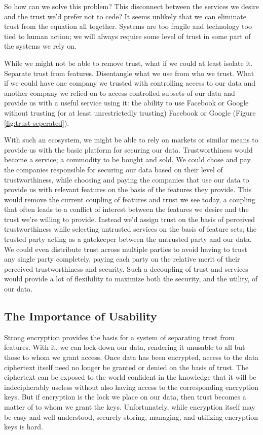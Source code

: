 So how can we solve this problem? This disconnect between the services
we desire and the trust we'd prefer not to cede? It seems unlikely
that we can eliminate trust from the equation all together. Systems
are too fragile and technology too tied to human action; we will
always require some level of trust in some part of the systems we rely
on.

While we might not be able to remove trust, what if we could at least
isolate it. Separate trust from features. Disentangle what we use from
who we trust. What if we could have one company we trusted with
controlling access to our data and another company we relied on to
access controlled subsets of our data and provide us with a useful
service using it: the ability to use Facebook or Google without
trusting (or at least unrestrictedly trusting) Facebook or Google
(Figure \ref{fig:trust-seperated}).

With such an ecosystem, we might be able to rely on markets or similar
means to provide us with the basic platform for securing our
data. Trustworthiness would become a service; a commodity to be bought
and sold. We could chose and pay the companies responsible for
securing our data based on their level of trustworthiness, while
choosing and paying the companies that use our data to provide us with
relevant features on the basis of the features they provide. This
would remove the current coupling of features and trust we see today,
a coupling that often leads to a conflict of interest between the
features we desire and the trust we're willing to provide. Instead
we'd assign trust on the basis of perceived trustworthiness while
selecting untrusted services on the basis of feature sets; the trusted
party acting as a gatekeeper between the untrusted party and our
data. We could even distribute trust across multiple parties to avoid
having to trust any single party completely, paying each party on the
relative merit of their perceived trustworthiness and security. Such a
decoupling of trust and services would provide a lot of flexibility to
maximize both the security, and the utility, of our data.

\subsection{The Importance of Usability}

Strong encryption provides the basis for a system of separating trust
from features. With it, we can lock-down our data, rendering it
unusable to all but those to whom we grant access. Once data has been
encrypted, access to the data ciphertext itself need no longer be
granted or denied on the basis of trust. The ciphertext can be exposed
to the world confident in the knowledge that it will be indecipherably
useless without also having access to the corresponding encryption
keys. But if encryption is the lock we place on our data, then trust
becomes a matter of to whom we grant the keys. Unfortunately, while
encryption itself may be easy and well understood, securely storing,
managing, and utilizing encryption keys is hard.

